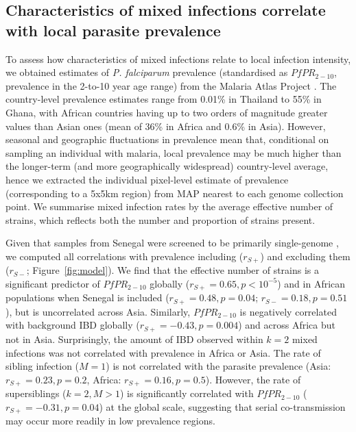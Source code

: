 \documentclass[9pt,lineno]{elife}
\begin{document}
\subsection{Characteristics of mixed infections correlate with local parasite prevalence}

To assess how characteristics of mixed infections relate to local infection intensity, we obtained estimates of {\it P. falciparum} prevalence (standardised as $PfPR_{2-10}$, prevalence in the 2-to-10 year age range) from the Malaria Atlas Project \citep[see Table~\ref{tab:Pf3k}]{MAP2017}. The country-level prevalence estimates range from 0.01\% in Thailand to 55\% in Ghana, with African countries having up to two orders of magnitude greater values than Asian ones (mean of 36\% in Africa and 0.6\% in Asia). However, seasonal and geographic fluctuations in prevalence mean that, conditional on sampling an individual with malaria, local prevalence may be much higher than the longer-term (and more geographically widespread) country-level average, hence we extracted the individual pixel-level estimate of prevalence (corresponding to a 5x5km region) from MAP nearest to each genome collection point. We summarise mixed infection rates by the average effective number of strains, which reflects both the number and proportion of strains present.  

Given that samples from Senegal were screened to be primarily single-genome \citep{Daniels2015}, we computed all correlations with prevalence including ($r_{S+}$) and excluding them ($r_{S-}$; Figure~\ref{fig:model}). We find that the effective number of strains is a significant predictor of $PfPR_{2-10}$ globally ($r_{S+} = 0.65, p < 10^{-5}$) and in African populations when Senegal is included ($r_{S+} = 0.48, p=0.04$; $r_{S-} = 0.18, p=0.51$), but is uncorrelated across Asia.  Similarly, $PfPR_{2-10}$ is negatively correlated with background IBD globally ($r_{S+} = -0.43, p=0.004$) and across Africa but not in Asia.  Surprisingly, the amount of IBD observed within $k=2$ mixed infections was not correlated with prevalence in Africa or Asia. The rate of sibling infection ($M=1$) is not correlated with the parasite prevalence (Asia: $r_{S+} = 0.23, p=0.2$, Africa: $r_{S+} = 0.16, p=0.5$). However, the rate of supersiblings ($k=2, M>1$) is significantly correlated with $PfPR_{2-10}$ ($r_{S+} = -0.31, p=0.04$) at the global scale, suggesting that serial co-transmission may occur more readily in low prevalence regions.
\end{document}
